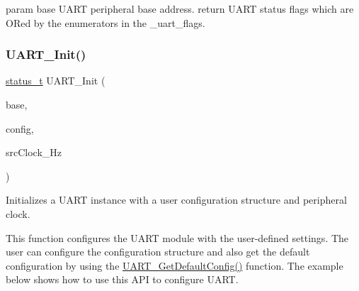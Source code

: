 param base U\+A\+RT peripheral base address. return U\+A\+RT status flags which are O\+Red by the enumerators in the \+\_\+uart\+\_\+flags. \mbox{\label{group__uart__driver_gab5965a8e11f7e1d4d531141291fd5288}} 
\subsubsection{\texorpdfstring{UART\_Init()}{UART\_Init()}}
{\footnotesize\ttfamily \mbox{\hyperlink{group__ksdk__common_gaaabdaf7ee58ca7269bd4bf24efcde092}{status\+\_\+t}} U\+A\+R\+T\+\_\+\+Init (\begin{DoxyParamCaption}\item[{\mbox{\hyperlink{struct_u_a_r_t___type}{U\+A\+R\+T\+\_\+\+Type}} $\ast$}]{base,  }\item[{const \mbox{\hyperlink{group__uart__driver_ga032da70848aac8bc9c3904a32bde5899}{uart\+\_\+config\+\_\+t}} $\ast$}]{config,  }\item[{uint32\+\_\+t}]{src\+Clock\+\_\+\+Hz }\end{DoxyParamCaption})}



Initializes a U\+A\+RT instance with a user configuration structure and peripheral clock. 

This function configures the U\+A\+RT module with the user-\/defined settings. The user can configure the configuration structure and also get the default configuration by using the \mbox{\hyperlink{group__uart__driver_ga47c7c09e04a0497f4530d553e27d96c5}{U\+A\+R\+T\+\_\+\+Get\+Default\+Config()}} function. The example below shows how to use this A\+PI to configure U\+A\+RT. 
\begin{DoxyCode}{0}
\end{DoxyCode}



